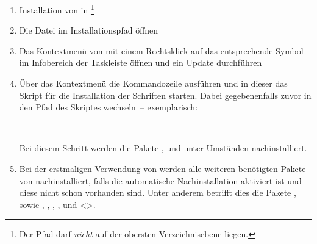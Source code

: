 \begin{enumerate}
\item Installation von  in 
  \footnote{Der Pfad darf \emph{nicht} auf der obersten Verzeichnisebene 
   liegen.
  }
\item Die Datei  im Installationspfad öffnen
\item Das Kontextmenü von  mit einem 
  Rechtsklick auf das entsprechende Symbol im Infobereich der Taskleiste öffnen 
  und ein Update durchführen
\item Über das Kontextmenü die Kommandozeile ausführen und in dieser das Skript 
  für die Installation der Schriften  starten.
  Dabei gegebenenfalls zuvor in den Pfad des Skriptes wechseln~-- exemplarisch:
  \begin{quoting}[leftmargin=1.5em,rightmargin=0pt]
  \newline
  \,
  \end{quoting}
  Bei diesem Schritt werden die Pakete ,  
  und  unter Umständen nachinstalliert.
\item Bei der erstmaligen Verwendung von \TUDScript werden alle weiteren 
  benötigten Pakete von  
  nachinstalliert, falls die automatische Nachinstallation aktiviert ist und 
  diese nicht schon vorhanden sind. Unter anderem betrifft dies die Pakete 
  ,  sowie , 
   , , 
  ,  und <>.  
\end{enumerate}
%
